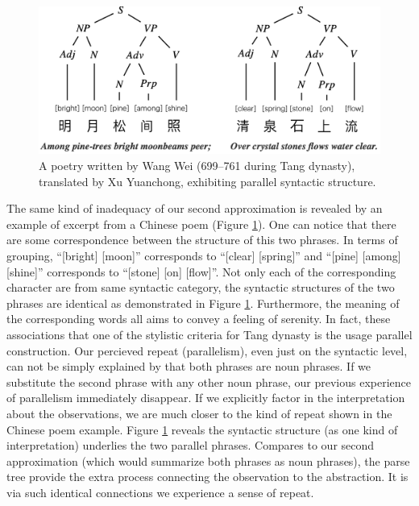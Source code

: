 % 
\begin{figure}
    \centering 
    \includegraphics[width=0.8\linewidth]{Chinese poem.png}
    \caption{A poetry written by Wang Wei (699–761 during Tang dynasty), translated by Xu Yuanchong, exhibiting parallel syntactic structure.} 
    \label{fig: Chinese poem}
\end{figure}


The same kind of inadequacy of our second approximation is revealed by an example of excerpt from a Chinese poem (Figure \ref{fig: Chinese poem}). One can notice that there are some correspondence between the structure of this two phrases. In terms of grouping, ``[bright] [moon]'' corresponds to ``[clear] [spring]'' and ``[pine] [among] [shine]'' corresponds to ``[stone] [on] [flow]''. Not only each of the corresponding character are from same syntactic category, the syntactic structures of the two phrases are identical as demonstrated in Figure \ref{fig: Chinese poem}. Furthermore, the meaning of the corresponding words all aims to convey a feeling of serenity. In fact, these associations that one of the stylistic criteria for Tang dynasty is the usage parallel construction. 
% 
Our percieved repeat (parallelism), even just on the syntactic level, can not be simply explained by that both phrases are noun phrases. If we substitute the second phrase with any other noun phrase, our previous experience of parallelism immediately disappear. If we explicitly factor in the interpretation about the observations, we are much closer to the kind of repeat shown in the Chinese poem example. Figure \ref{fig: Chinese poem} reveals the syntactic structure (as one kind of interpretation) underlies the two parallel phrases. 
Compares to our second approximation (which would summarize both phrases as noun phrases), the parse tree provide the extra process connecting the observation to the abstraction. It is via such identical connections we experience a sense of repeat.   

